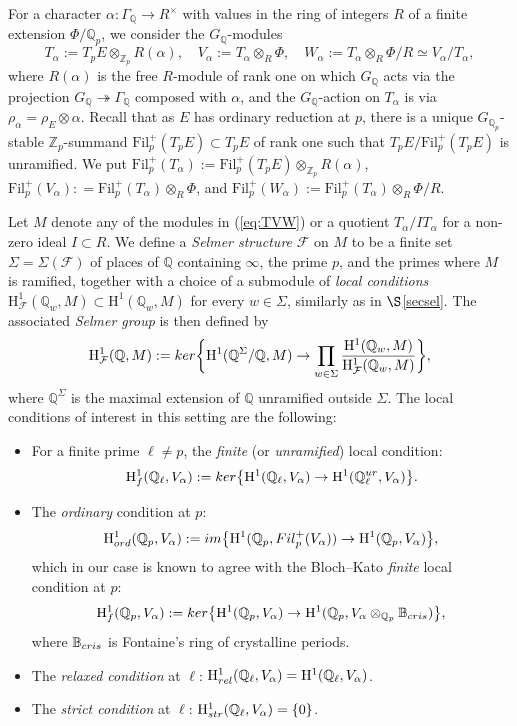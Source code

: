 \documentclass[10pt,reqno]{amsart}
\numberwithin{equation}{section}
\theoremstyle{plain}
\theoremstyle{definition}
\theoremstyle{definition}
\theoremstyle{plain}
\theoremstyle{plain}
\theoremstyle{plain}
\theoremstyle{plain}
\theoremstyle{plain}
\theoremstyle{plain}
\newcommand{\Fil}{\mathrm{Fil}}
\newcommand{\Z}{\mathbb{Z}}
\newcommand{\Q}{\mathbb{Q}}
\newcommand{\Zp}{\mathbb{Z}_{p}}
\newcommand{\cF}{\mathcal{F}}
\newcommand{\Fcal}{\mathcal{F}}
\newcommand{\rH}{\mathrm{H}}
\begin{document}
For a character $\alpha:\Gamma_\Q\to R^{\times}$ with values in the ring of integers $R$ of a finite extension $\Phi/\Q_p$, we consider the $G_\Q$-modules
\begin{equation}\label{eq:TVW}
T_\alpha:=T_pE\otimes_{\Z_p}R(\alpha),\quad
V_\alpha:=T_\alpha\otimes_{R}\Phi,\quad W_\alpha:=T_\alpha\otimes_{R}\Phi/R\simeq V_\alpha/T_\alpha,
\end{equation}
where $R(\alpha)$ is the free $R$-module of rank one on which $G_\Q$ acts via the projection $G_\Q\twoheadrightarrow\Gamma_\Q$ composed with $\alpha$, and the $G_\Q$-action on $T_\alpha$ is via $\rho_\alpha = \rho_E\otimes\alpha$.  Recall that as $E$ has ordinary reduction at $p$, there is a unique $G_{\Q_p}$-stable $\Zp$-summand  $\Fil_p^+(T_pE) \subset T_pE$
of rank one such that $T_pE/\Fil_p^+(T_pE)$ is unramified. We put $\Fil_p^+(T_\alpha) := \Fil_p^+(T_pE)\otimes_{\Z_p} R(\alpha)$, $\Fil_p^+(V_\alpha): = \Fil_p^+(T_\alpha)\otimes_R\Phi$,
and $\Fil_p^+(W_\alpha) := \Fil_p^+(T_\alpha)\otimes_R\Phi/R$.

Let $M$ denote any of the modules in (\ref{eq:TVW}) or a quotient $T_\alpha/IT_\alpha$ for a non-zero ideal $I\subset R$.
We define a \emph{Selmer structure} $\mathcal{F}$ on $M$ to be a finite set $\Sigma=\Sigma(\mathcal{F})$ of places of $\Q$ containing $\infty$, the prime $p$, and the primes where $M$ is ramified, together with a choice of a  submodule of \emph{local conditions} $\rH^1_\cF(\Q_w,M)\subset\rH^1(\Q_w,M)$ for every $w\in\Sigma$, similarly as in $\S$\ref{secsel}. The associated \emph{Selmer group} is then defined by
\[
\rH^1_{\Fcal}(\Q,M):={\rm ker}\biggl\{\rH^1(\Q^\Sigma/\Q,M)\rightarrow\prod_{w\in\Sigma}\frac{\rH^1(\Q_w,M)}{\rH^1_{\Fcal}(\Q_w,M)}\biggr\},
\]
where $\Q^\Sigma$ is the maximal extension of $\Q$ unramified outside $\Sigma$. 
The local conditions of interest in this setting are the following:
\begin{itemize}
\item For a finite prime $\ell\neq p$, the \emph{finite} (or \emph{unramified}) local condition:
\[
\rH^1_f(\Q_\ell,V_{\alpha}):={\rm ker}\bigl\{\rH^1(\Q_\ell,V_{\alpha})\rightarrow\rH^1(\Q_\ell^{\rm ur},V_{\alpha})\bigr\}.
\]
\item The \emph{ordinary} condition at $p$:
\[
\rH^1_{\rm ord}(\Q_p,V_\alpha):={\rm im}\bigl\{\rH^1(\Q_p,{\rm Fil}_p^+(V_\alpha))\rightarrow\rH^1(\Q_p,V_\alpha)\bigr\},
\]
which in our case is known to agree with the Bloch--Kato \emph{finite} local condition at $p$:
\[
\rH^1_f(\Q_p,V_{\alpha}):={\rm ker}\bigl\{\rH^1(\Q_p,V_{\alpha})\rightarrow\rH^1(\Q_p,V_{\alpha}\otimes_{\Q_p}\mathbb{B}_{\rm cris})\bigr\},
\]
where $\mathbb{B}_{\rm cris}$ is Fontaine's ring of crystalline periods.
\item The \emph{relaxed condition} at $\ell$: $\rH^1_{\rm rel}(\Q_\ell,V_{\alpha})=\rH^1(\Q_\ell,V_{\alpha})$.
\item The \emph{strict condition} at $\ell$: $\rH^1_{\rm str}(\Q_\ell,V_{\alpha})=\{0\}$.
\end{itemize}
\end{document}
